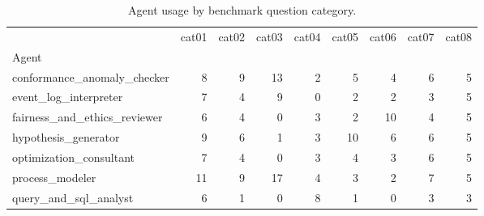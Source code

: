 \begin{table}
\caption{Agent usage by benchmark question category.}
\label{tab:agent-usage-by-category}
\begin{tabular}{lrrrrrrrr}
\toprule
 & cat01 & cat02 & cat03 & cat04 & cat05 & cat06 & cat07 & cat08 \\
Agent &  &  &  &  &  &  &  &  \\
\midrule
conformance\_anomaly\_checker & 8 & 9 & 13 & 2 & 5 & 4 & 6 & 5 \\
event\_log\_interpreter & 7 & 4 & 9 & 0 & 2 & 2 & 3 & 5 \\
fairness\_and\_ethics\_reviewer & 6 & 4 & 0 & 3 & 2 & 10 & 4 & 5 \\
hypothesis\_generator & 9 & 6 & 1 & 3 & 10 & 6 & 6 & 5 \\
optimization\_consultant & 7 & 4 & 0 & 3 & 4 & 3 & 6 & 5 \\
process\_modeler & 11 & 9 & 17 & 4 & 3 & 2 & 7 & 5 \\
query\_and\_sql\_analyst & 6 & 1 & 0 & 8 & 1 & 0 & 3 & 3 \\
\bottomrule
\end{tabular}
\end{table}
